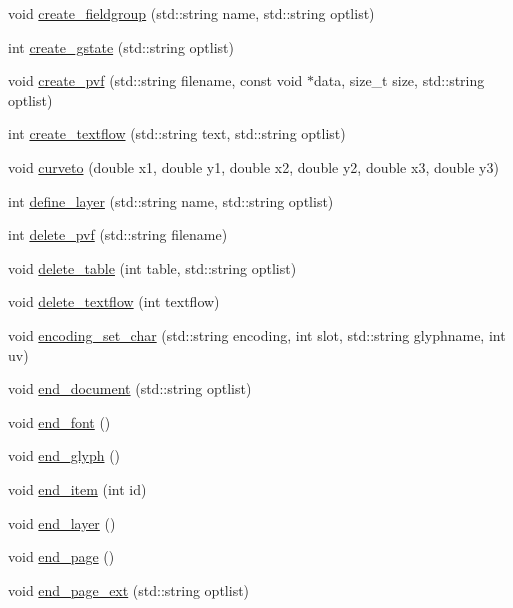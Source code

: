 \begin{DoxyCompactItemize}
\item 
void \hyperlink{classPDFlib_a44fb65e6533101477d39fde1730c92e6}{create\+\_\+fieldgroup} (std\+::string name, std\+::string optlist)
\item 
int \hyperlink{classPDFlib_ae2eabf14be762f2999aedd15a1626234}{create\+\_\+gstate} (std\+::string optlist)
\item 
void \hyperlink{classPDFlib_a208ad8e80e2733820d54e6fb4f6313b8}{create\+\_\+pvf} (std\+::string filename, const void $\ast$data, size\+\_\+t size, std\+::string optlist)
\item 
int \hyperlink{classPDFlib_a9b80d68d417defcc9547b007c61b8877}{create\+\_\+textflow} (std\+::string text, std\+::string optlist)
\item 
void \hyperlink{classPDFlib_ae331bf087034fdc7961fbc95db5479a6}{curveto} (double x1, double y1, double x2, double y2, double x3, double y3)
\item 
int \hyperlink{classPDFlib_a9ee76ee9081c4ef79c378ad4ed62df58}{define\+\_\+layer} (std\+::string name, std\+::string optlist)
\item 
int \hyperlink{classPDFlib_a60c311c1176f37551fade62b15e260fa}{delete\+\_\+pvf} (std\+::string filename)
\item 
void \hyperlink{classPDFlib_a87643d5d18be98c83ae636b6e3013e8f}{delete\+\_\+table} (int table, std\+::string optlist)
\item 
void \hyperlink{classPDFlib_ac4562f4944113165c37d27c3f2481412}{delete\+\_\+textflow} (int textflow)
\item 
void \hyperlink{classPDFlib_a83ebfdf9ada3df0634b6748aa2d27eff}{encoding\+\_\+set\+\_\+char} (std\+::string encoding, int slot, std\+::string glyphname, int uv)
\item 
void \hyperlink{classPDFlib_aadbf95532d240e683aeda234624c7f61}{end\+\_\+document} (std\+::string optlist)
\item 
void \hyperlink{classPDFlib_ad38e3338e0217a90ff322083b7d66843}{end\+\_\+font} ()
\item 
void \hyperlink{classPDFlib_a75da9905bdccda79115aa724a7aff2bd}{end\+\_\+glyph} ()
\item 
void \hyperlink{classPDFlib_a1052c7d1cb2993e32341718e9c36c30c}{end\+\_\+item} (int id)
\item 
void \hyperlink{classPDFlib_a485ab7dd0996da8194e768e1c97eed21}{end\+\_\+layer} ()
\item 
void \hyperlink{classPDFlib_ad155354f3b07ccf69bc82000211a4018}{end\+\_\+page} ()
\item 
void \hyperlink{classPDFlib_aaeb1219f151a8b54e2c02e4e4633856b}{end\+\_\+page\+\_\+ext} (std\+::string optlist)

\end{DoxyCompactItemize}
